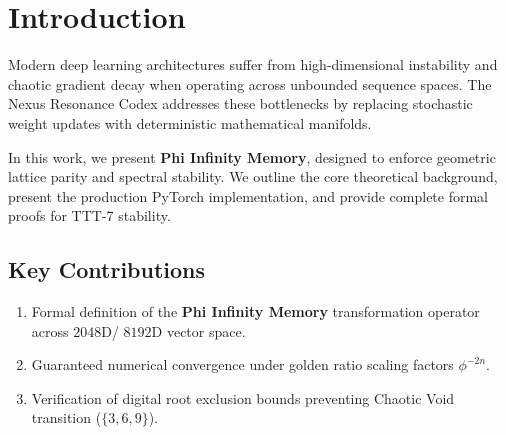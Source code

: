 \section{Introduction}
Modern deep learning architectures suffer from high-dimensional instability and chaotic gradient decay when operating across unbounded sequence spaces. The Nexus Resonance Codex addresses these bottlenecks by replacing stochastic weight updates with deterministic mathematical manifolds.

In this work, we present \textbf{Phi Infinity Memory}, designed to enforce geometric lattice parity and spectral stability. We outline the core theoretical background, present the production PyTorch implementation, and provide complete formal proofs for TTT-7 stability.

\subsection{Key Contributions}
\begin{enumerate}[label=\textbf{\arabic*.}]
    \item Formal definition of the \textbf{Phi Infinity Memory} transformation operator across $2048$D/ $8192$D vector space.
    \item Guaranteed numerical convergence under golden ratio scaling factors $\phi^{-2n}$.
    \item Verification of digital root exclusion bounds preventing Chaotic Void transition ($\{3, 6, 9\}$).
\end{enumerate}